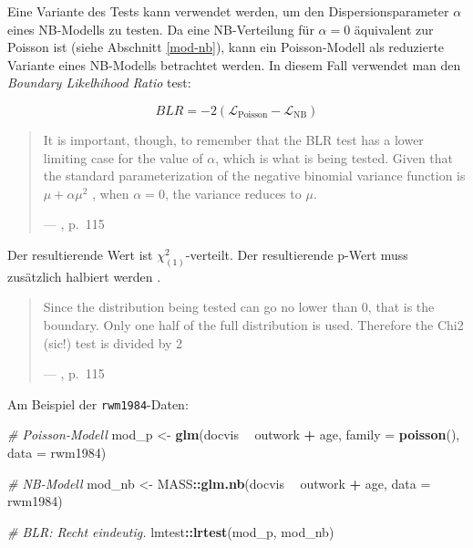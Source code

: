 \documentclass[ngerman,a4paper,]{scrartcl}
\newenvironment{Shaded}{\begin{snugshade}}{\end{snugshade}}
\newcommand{\CommentTok}[1]{\textcolor[rgb]{0.56,0.35,0.01}{\textit{#1}}}
\newcommand{\DataTypeTok}[1]{\textcolor[rgb]{0.13,0.29,0.53}{#1}}
\newcommand{\KeywordTok}[1]{\textcolor[rgb]{0.13,0.29,0.53}{\textbf{#1}}}
\newcommand{\NormalTok}[1]{#1}
\newcommand{\OperatorTok}[1]{\textcolor[rgb]{0.81,0.36,0.00}{\textbf{#1}}}
\newcommand{\StringTok}[1]{\textcolor[rgb]{0.31,0.60,0.02}{#1}}
\theoremstyle{definition}
\theoremstyle{definition}
\theoremstyle{definition}
\theoremstyle{remark}
\let\BeginKnitrBlock\begin \let\EndKnitrBlock\end
\begin{document}
Eine Variante des Tests kann verwendet werden, um den Dispersionsparameter \(\alpha\) eines NB-Modells zu testen. Da eine NB-Verteilung für \(\alpha = 0\) äquivalent zur Poisson ist (siehe Abschnitt \ref{mod-nb}), kann ein Poisson-Modell als reduzierte Variante eines NB-Modells betrachtet werden. In diesem Fall verwendet man den \emph{Boundary Likelhihood Ratio} test:

\BeginKnitrBlock{definition}[Boundary Likelihood Ratio Test]
\protect\hypertarget{def:BLR}{}{\label{def:BLR} \iffalse (Boundary Likelihood Ratio Test) \fi{} }\begin{equation}
 BLR = -2 (\mathcal{L}_\mathrm{Poisson} - \mathcal{L}_\mathrm{NB})
\end{equation}
\EndKnitrBlock{definition}

\begin{quote}
It is important, though, to remember that the BLR test has a lower limiting case for the value of \(\alpha\), which is what is being tested. Given that the standard parameterization of the negative binomial variance function is \(\mu + \alpha \mu^2\) , when \(\alpha = 0\), the variance reduces to \(\mu\).

--- \citet{hilbeModelingCountData2014}, p.~115
\end{quote}

Der resultierende Wert ist \(\chi^2_{(1)}\)-verteilt. Der resultierende p-Wert muss zusätzlich halbiert werden \citep[siehe][p.~115]{hilbeModelingCountData2014}.

\begin{quote}
Since the distribution being tested can go no lower than 0, that is the boundary. Only one half of the full distribution is used. Therefore the Chi2 (sic!) test is divided by 2

--- \citet{hilbeModelingCountData2014}, p.~115
\end{quote}

Am Beispiel der \texttt{rwm1984}-Daten:

\begin{Shaded}
\begin{Highlighting}[]
\CommentTok{# Poisson-Modell}
\NormalTok{mod_p <-}\StringTok{ }\KeywordTok{glm}\NormalTok{(docvis }\OperatorTok{~}\StringTok{ }\NormalTok{outwork }\OperatorTok{+}\StringTok{ }\NormalTok{age, }\DataTypeTok{family =} \KeywordTok{poisson}\NormalTok{(), }\DataTypeTok{data =}\NormalTok{ rwm1984)}

\CommentTok{# NB-Modell}
\NormalTok{mod_nb <-}\StringTok{ }\NormalTok{MASS}\OperatorTok{::}\KeywordTok{glm.nb}\NormalTok{(docvis }\OperatorTok{~}\StringTok{ }\NormalTok{outwork }\OperatorTok{+}\StringTok{ }\NormalTok{age, }\DataTypeTok{data =}\NormalTok{ rwm1984)}

\CommentTok{# BLR: Recht eindeutig.}
\NormalTok{lmtest}\OperatorTok{::}\KeywordTok{lrtest}\NormalTok{(mod_p, mod_nb)}
\end{Highlighting}
\end{Shaded}
\end{document}
